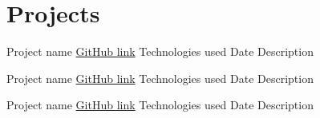 \section*{Projects}
\begin{entrylist}
    \entry
    {Project name}
    {\href{https://github.com/...}{GitHub link}}
    {Technologies used}
    {Date}
    {Description}

    \entry
    {Project name}
    {\href{https://github.com/...}{GitHub link}}
    {Technologies used}
    {Date}
    {Description}

    \entry
    {Project name}
    {\href{https://github.com/...}{GitHub link}}
    {Technologies used}
    {Date}
    {Description}
\end{entrylist}